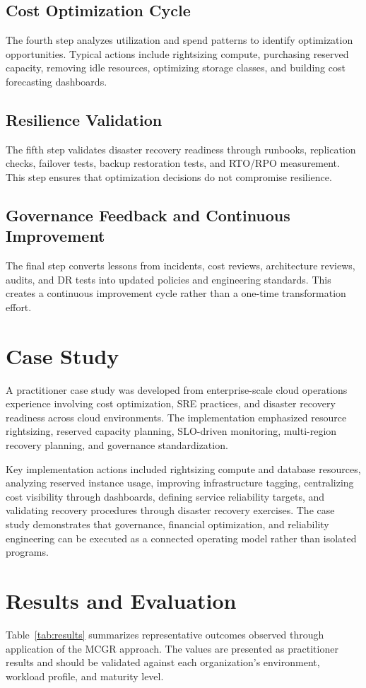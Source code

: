\documentclass[conference]{IEEEtran}
\begin{document}
\subsection{Cost Optimization Cycle}
The fourth step analyzes utilization and spend patterns to identify optimization opportunities. Typical actions include rightsizing compute, purchasing reserved capacity, removing idle resources, optimizing storage classes, and building cost forecasting dashboards.

\subsection{Resilience Validation}
The fifth step validates disaster recovery readiness through runbooks, replication checks, failover tests, backup restoration tests, and RTO/RPO measurement. This step ensures that optimization decisions do not compromise resilience.

\subsection{Governance Feedback and Continuous Improvement}
The final step converts lessons from incidents, cost reviews, architecture reviews, audits, and DR tests into updated policies and engineering standards. This creates a continuous improvement cycle rather than a one-time transformation effort.

\section{Case Study}
A practitioner case study was developed from enterprise-scale cloud operations experience involving cost optimization, SRE practices, and disaster recovery readiness across cloud environments. The implementation emphasized resource rightsizing, reserved capacity planning, SLO-driven monitoring, multi-region recovery planning, and governance standardization.

Key implementation actions included rightsizing compute and database resources, analyzing reserved instance usage, improving infrastructure tagging, centralizing cost visibility through dashboards, defining service reliability targets, and validating recovery procedures through disaster recovery exercises. The case study demonstrates that governance, financial optimization, and reliability engineering can be executed as a connected operating model rather than isolated programs.

\section{Results and Evaluation}
Table~\ref{tab:results} summarizes representative outcomes observed through application of the MCGR approach. The values are presented as practitioner results and should be validated against each organization's environment, workload profile, and maturity level.
\end{document}
